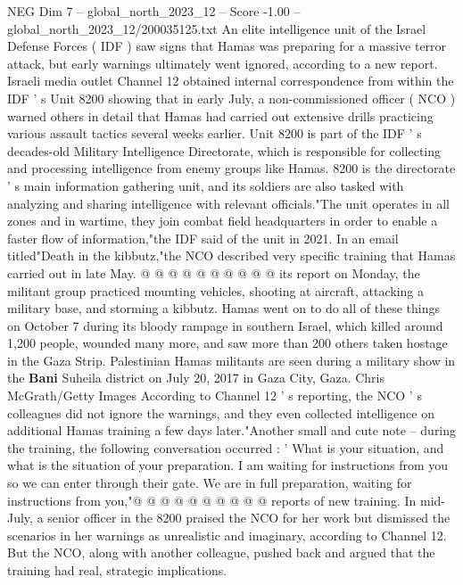 \begin{textsample}{NEG Dim 7 – global\_north\_2023\_12 – Score -1.00 – global\_north\_2023\_12/200035125.txt}  \label{ex:f7_neg_308}
An elite intelligence unit of the Israel Defense Forces ( IDF ) saw signs that Hamas was preparing for a massive terror attack, but early warnings ultimately went ignored, according to a new report.
Israeli media outlet Channel 12 obtained internal correspondence from within the IDF ' s Unit 8200 showing that in early July, a non-commissioned officer ( NCO ) warned others in detail that Hamas had carried out extensive drills practicing various assault tactics several weeks earlier.
Unit 8200 is part of the IDF ' s decades-old Military Intelligence Directorate, which is responsible for collecting and processing intelligence from enemy groups like Hamas. 8200 is the directorate ' s main information gathering unit, and its soldiers are also tasked with analyzing and sharing intelligence with relevant officials."The unit operates in all zones and in wartime, they join combat field headquarters in order to enable a faster flow of information,"the IDF said of the unit in 2021.
In an email titled"Death in the kibbutz,"the NCO described very specific training that Hamas carried out in late May. @ @ @ @ @ @ @ @ @ @ its report on Monday, the militant group practiced mounting vehicles, shooting at aircraft, attacking a military base, and storming a kibbutz.
Hamas went on to do all of these things on October 7 during its bloody rampage in southern Israel, which killed around 1,200 people, wounded many more, and saw more than 200 others taken hostage in the Gaza Strip.
Palestinian Hamas militants are seen during a military show in the \textbf{Bani} Suheila district on July 20, 2017 in Gaza City, Gaza.
Chris McGrath/Getty Images According to Channel 12 ' s reporting, the NCO ' s colleagues did not ignore the warnings, and they even collected intelligence on additional Hamas training a few days later."Another small and cute note -- during the training, the following conversation occurred : ' What is your situation, and what is the situation of your preparation.
I am waiting for instructions from you so we can enter through their gate.
We are in full preparation, waiting for instructions from you,"@ @ @ @ @ @ @ @ @ @ reports of new training.
In mid-July, a senior officer in the 8200 praised the NCO for her work but dismissed the scenarios in her warnings as unrealistic and imaginary, according to Channel 12.
But the NCO, along with another colleague, pushed back and argued that the training had real, strategic implications.

\end{textsample}

